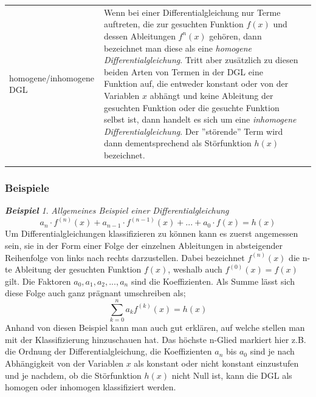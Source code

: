 \documentclass[a4paper,11pt]{article}
\theoremstyle{remark}
\newtheorem{example}{\textbf{Beispiel}}[section]
\begin{document}
\begin{flushleft}
\begin{tabular}[h]{l|p{9.6cm}r}
\\ homogene/inhomogene DGL & Wenn bei einer Differentialgleichung nur Terme auftreten, die zur gesuchten Funktion $f(x)$ und dessen Ableitungen $f^n(x)$ gehören, dann bezeichnet man diese als eine \textit{homogene Differentialgleichung}. Tritt aber zusätzlich zu diesen beiden Arten von Termen in der DGL eine Funktion auf, die entweder konstant oder von der Variablen $x$ abhängt und keine Ableitung der gesuchten Funktion oder die gesuchte Funktion selbst ist, dann handelt es sich um eine \textit{inhomogene Differentialgleichung}. Der ''störende'' Term wird dann dementsprechend als Störfunktion $h(x)$ bezeichnet.\\ \\
\end{tabular}
\end{flushleft}
\subsubsection{Beispiele}
\begin{example}{\textit{Allgemeines Beispiel einer Differentialgleichung}}
\begin{equation}\label{eq5}
a_n \cdot f^{(n)}(x)+a_{n-1}\cdot f^{(n-1)}(x)+...+ a_0 \cdot f(x)=h(x)
\end{equation}
Um Differentialgleichungen klassifizieren zu können kann es zuerst angemessen sein, sie in der Form einer Folge der einzelnen Ableitungen in absteigender Reihenfolge von links nach rechts darzustellen. Dabei bezeichnet $f^{(n)}(x)$ die n-te Ableitung der gesuchten Funktion $f(x)$, weshalb auch $f^{(0)}(x)=f(x)$ gilt. Die Faktoren $a_0, a_1, a_2,...,a_n$ sind die Koeffizienten. Als Summe lässt sich diese Folge auch ganz prägnant umschreiben als;
\begin{equation}\label{eq5}
\sum_{k=0}^n a_k f^{(k)}(x)=h(x)
\end{equation}
Anhand von diesen Beispiel kann man auch gut erklären, auf welche stellen man mit der Klassifizierung hinzuschauen hat. Das höchste n-Glied markiert hier z.B. die Ordnung der Differentialgleichung, die Koeffizienten $a_n$ bis $a_0$ sind je nach Abhängigkeit von der Variablen $x$ als konstant oder nicht konstant einzustufen und je nachdem, ob die Störfunktion $h(x)$ nicht Null ist, kann die DGL als homogen oder inhomogen klassifiziert werden.
\end{example}
\vspace{0,5cm}
\end{document}
